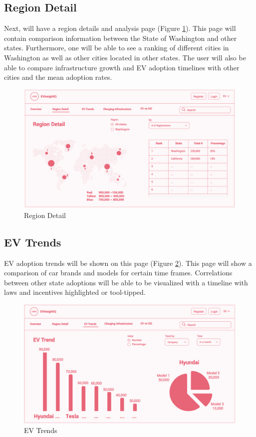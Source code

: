 \documentclass{article}
\begin{document}
\subsection{Region Detail}
Next, will have a region details and analysis page (Figure \ref{fig:city}).
This page will contain comparison information between the State of Washington
and other states. Furthermore, one will be able to see a ranking of different
cities in Washington as well as other cities located in other states.  The user
will also be able to compare infrastructure growth and EV
adoption timelines with other cities and the mean adoption rates.
\begin{figure}[ht]
    \centering
    \includegraphics[scale=0.25]{Popularity Analysis}
    \caption{Region Detail}
    \label{fig:city}
\end{figure}

\newpage
\subsection{EV Trends}
EV adoption trends will be shown on this page (Figure \ref{fig:evtrends}).
This page will show a comparison of car brands and models for certain time
frames.  Correlations between other state adoptions will be able to be
visualized with a timeline with laws and incentives highlighted or tool-tipped.
\begin{figure}[ht]
    \centering
    \includegraphics[scale=0.25]{EV Trends}
    \caption{EV Trends}
    \label{fig:evtrends}
\end{figure}
\end{document}
